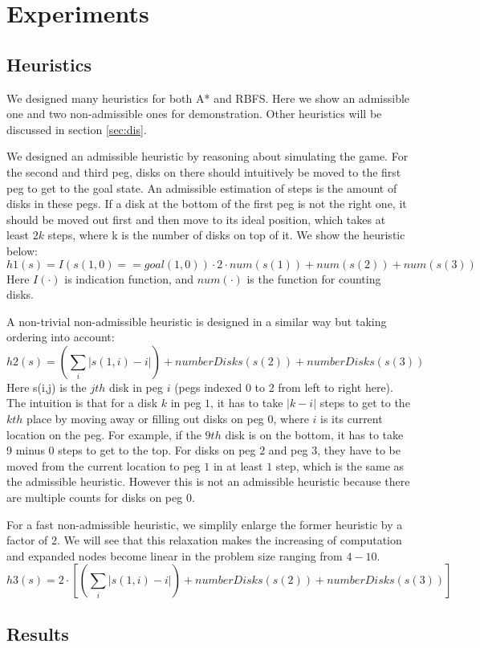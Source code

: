 \section{Experiments}\label{sec:exp}

\subsection{Heuristics}
We designed many heuristics for both A* and RBFS. Here we show an admissible one and two non-admissible ones for demonstration. Other heuristics will be discussed in section \ref{sec:dis}.

We designed an admissible heuristic by reasoning about simulating the game. For the second and third peg, disks on there should intuitively be moved to the first peg to get to the goal state. An admissible estimation of steps is the amount of disks in these pegs. If a disk at the bottom of the first peg is not the right one, it should be moved out first and then move to its ideal position, which takes at least $2k$ steps, where k is the number of disks on top of it. We show the heuristic below:
\[
h1(s) = I(s(1,0)==goal(1,0))\cdot 2 \cdot num(s(1)) + num(s(2)) + num(s(3))
\]
Here $I(\cdot)$ is indication function, and $num(\cdot)$ is the function for counting disks.

A non-trivial non-admissible heuristic is designed in a similar way but taking ordering into account:
\[
h2(s) = (\sum_i |s(1,i)-i| ) + numberDisks(s(2)) + numberDisks(s(3))
\]
Here s(i,j) is the $jth$ disk in peg $i$ (pegs indexed 0 to 2 from left to right here). The intuition is that for a disk $k$ in peg $1$, it has to take $|k-i|$ steps to get to the $kth$ place by moving away or filling out disks on peg $0$, where $i$ is its current location on the peg. For example, if the $9th$ disk is on the bottom, it has to take 9 minus 0 steps to get to the top. For disks on peg $2$ and peg $3$, they have to be moved from the current location to peg $1$ in at least $1$ step, which is the same as the admissible heuristic. However this is not an admissible heuristic because there are multiple counts for disks on peg $0$. 

For a fast non-admissible heuristic, we simplily enlarge the former heuristic by a factor of $2$. We will see that this relaxation makes the increasing of computation and expanded nodes become linear in the problem size ranging from $4-10$.
\[
h3(s) = 2 \cdot [(\sum_i |s(1,i)-i| ) + numberDisks(s(2)) + numberDisks(s(3))]
\]
\subsection{Results}

